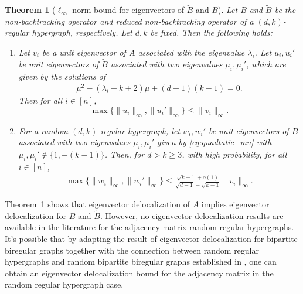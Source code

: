 \documentclass[11pt,reqno]{amsart}
\newtheorem{theorem}{Theorem}[section]
\theoremstyle{definition}
\begin{document}
\begin{theorem}[$\ell_{\infty}$-norm bound for eigenvectors of $\tilde B$ and $B$]\label{thm:bi_tildeB}
    Let $B$ and $\tilde B$ be the non-backtracking operator and reduced non-backtracking operator of a $(d,k)$-regular hypergraph, respectively. Let $d,k$ be fixed. Then the following holds:
 \begin{enumerate}
     \item Let $v_i$ be {a} unit  eigenvector of $A$ associated with the eigenvalue $\lambda_i$. Let $u_i,u_i'$ be unit eigenvectors of $\tilde B$ associated with two eigenvalues $\mu_i, \mu_i'$, which are given by the solutions of  
     \begin{align}\label{eq:quadtatic_mu}
     \mu^2 - (\lambda_i-k+2 )\mu + (d-1)(k-1) = 0.
     \end{align} Then  for all $i\in [n]$,
   \[  {\max}\{  \|u_i\|_{\infty}, \|u_i'\|_{\infty} \} \leq \|v_i\|_{\infty}.\]
     \item For a random $(d,k)$-regular {hypergraph}, let $w_i,w_i'$ be unit eigenvectors of $B$ associated with two eigenvalues $\mu_i, \mu_i'$ given by \eqref{eq:quadtatic_mu} with $\mu_i, \mu_i'\not\in \{1,-(k-1)\}$. Then, for $d> k \geq 3$, with high probability, for all $i\in [n]$, 
     \begin{align}
        {\max}\{ \|w_i\|_{\infty}, \|w_i'\|_{\infty} \} \leq  \frac{  \sqrt{k-1} +o(1)}{  \sqrt{d-1 } - \sqrt{k-1}  } \|v_i\|_{\infty}.
     \end{align}
 \end{enumerate}
\end{theorem}

Theorem~\ref{thm:bi_tildeB} shows that eigenvector delocalization of $A$ implies eigenvector delocalization for $B$ and $\tilde B$. However, no eigenvector delocalization results are available in the literature for the adjacency matrix random regular hypergraphs. It's possible that by adapting the result of eigenvector delocalization for bipartite biregular graphs \cite[Corollary 2.8]{yang2017bulk}  together with the connection between random regular hypergraphs and random bipartite biregular graphs established in \cite{dumitriu2021spectra}, one can obtain an eigenvector delocalization bound for the adjacency matrix in the random regular hypergraph case.  
\end{document}
